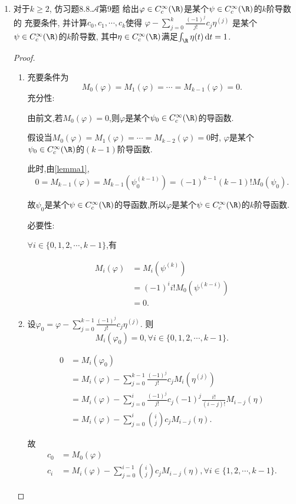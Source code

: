 \begin{quizb}
\begin{enumerate}
\item 对于\(k\geqslant 2\), 仿习题8.8.\(\boldsymbol{\mathscr{A}}\)第9题
给出\(\varphi\in C_c^{\infty}(\R)\)是某个\(\psi\in C_c^{\infty}(\R)\)的\(k\)阶导数的
充要条件, 并计算\(c_0,c_1,\cdots,c_k\)使得
\(\varphi-\sum_{j=0}^{k}\frac{(-1)^j}{j!}c_j\eta^{(j)}\)
是某个\(\psi\in C_c^{\infty}(\R)\)的\(k\)阶导数, 
其中\(\eta\in C_c^{\infty}(\R)\)满足\(\int_{\R}\eta(t)\,\dd t=1\).

\begin{proof}
    \begin{enumerate}
   \item 充要条件为
   $$M_0(\varphi) = M_1(\varphi) = \cdots = M_{k-1}(\varphi) = 0.$$
   充分性:

   由前文,若$M_0(\varphi)=0$,则$\varphi$是某个$\psi_0 \in C_c^{\infty}(\R)$的导函数.

   假设当$M_0(\varphi)=M_1(\varphi)=\cdots=M_{k-2}(\varphi)=0$时, $\varphi$是某个$\psi_0 \in C_c^{\infty}(\R)$的$(k-1)$阶导函数.

   此时,由\eqref{lemma1},$$0=M_{k-1}(\varphi) = M_{k-1}(\psi_0^{(k-1)}) = (-1)^{k-1}(k-1)!M_{0}(\psi_0).$$

   故$\psi_0$是某个$\psi \in C_c^{\infty}(\R)$的导函数,所以$\varphi$是某个$\psi \in C_c^{\infty}(\R)$的$k$阶导函数.

   必要性:

   $\forall i \in \{0,1,2,\cdots,k-1\}$,有

   \begin{align*}
   M_i(\varphi) & = M_i(\psi^{(k)}) \\
   & = (-1)^i i! M_0(\psi^{(k-i)}) \\
   & = 0.
   \end{align*}
   \item 设$\varphi_0 = \varphi - \sum_{j=0}^{k-1} \frac{(-1)^j}{j!} c_j \eta^{(j)}$.
   则$$M_i(\varphi_0) = 0, \forall i \in \{0,1,2,\cdots,k-1\}.$$

   \begin{align*}
      0 & = M_i(\varphi_0) \\
      & = M_i(\varphi) - \sum_{j=0}^{k-1} \frac{(-1)^j}{j!} c_j M_i(\eta^{(j)}) \\
      & = M_i(\varphi) - \sum_{j=0}^{i} \frac{(-1)^j}{j!} c_j (-1)^j \frac{i!}{(i-j)!} M_{i-j}(\eta) \\
      & = M_i(\varphi) - \sum_{j=0}^{i} \binom{i}{j} c_j M_{i-j}(\eta).
   \end{align*}

   故
   \begin{align*}
      c_0&=M_0(\varphi)\\
      c_i&=M_i(\varphi) - \sum_{j=0}^{i-1} \binom{i}{j} c_j M_{i-j}(\eta), \forall i \in \{1,2,\cdots,k-1\}.
   \end{align*}


\end{enumerate}
\end{proof}
\end{enumerate}
\end{quizb}
